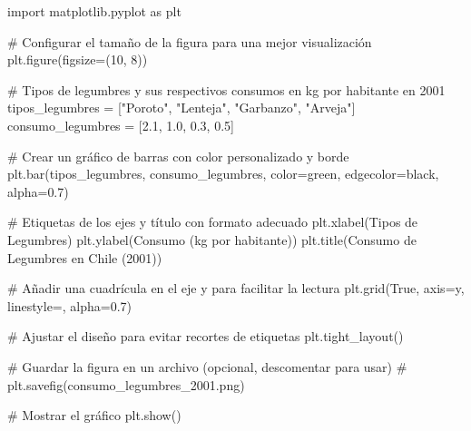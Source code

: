 \documentclass[
  jou,
  floatsintext,
  longtable,
  a4paper,
  nolmodern,
  notxfonts,
  notimes,
  colorlinks=true,linkcolor=blue,citecolor=blue,urlcolor=blue]{apa7}
\newenvironment{Shaded}{\begin{snugshade}}{\end{snugshade}}
\newcommand{\CommentTok}[1]{\textcolor[rgb]{0.37,0.37,0.37}{#1}}
\newcommand{\DecValTok}[1]{\textcolor[rgb]{0.68,0.00,0.00}{#1}}
\newcommand{\FloatTok}[1]{\textcolor[rgb]{0.68,0.00,0.00}{#1}}
\newcommand{\ImportTok}[1]{\textcolor[rgb]{0.00,0.46,0.62}{#1}}
\newcommand{\NormalTok}[1]{\textcolor[rgb]{0.00,0.23,0.31}{#1}}
\newcommand{\OperatorTok}[1]{\textcolor[rgb]{0.37,0.37,0.37}{#1}}
\newcommand{\StringTok}[1]{\textcolor[rgb]{0.13,0.47,0.30}{#1}}
\newcommand{\VariableTok}[1]{\textcolor[rgb]{0.07,0.07,0.07}{#1}}
\begin{document}
\begin{Shaded}
\begin{Highlighting}[]
\ImportTok{import}\NormalTok{ matplotlib.pyplot }\ImportTok{as}\NormalTok{ plt}

\CommentTok{\# Configurar el tamaño de la figura para una mejor visualización}
\NormalTok{plt.figure(figsize}\OperatorTok{=}\NormalTok{(}\DecValTok{10}\NormalTok{, }\DecValTok{8}\NormalTok{))}

\CommentTok{\# Tipos de legumbres y sus respectivos consumos en kg por habitante en 2001}
\NormalTok{tipos\_legumbres }\OperatorTok{=}\NormalTok{ [}\StringTok{"Poroto"}\NormalTok{, }\StringTok{"Lenteja"}\NormalTok{, }\StringTok{"Garbanzo"}\NormalTok{, }\StringTok{"Arveja"}\NormalTok{]}
\NormalTok{consumo\_legumbres }\OperatorTok{=}\NormalTok{ [}\FloatTok{2.1}\NormalTok{, }\FloatTok{1.0}\NormalTok{, }\FloatTok{0.3}\NormalTok{, }\FloatTok{0.5}\NormalTok{]}

\CommentTok{\# Crear un gráfico de barras con color personalizado y borde}
\NormalTok{plt.bar(tipos\_legumbres, consumo\_legumbres, color}\OperatorTok{=}\StringTok{\textquotesingle{}green\textquotesingle{}}\NormalTok{, edgecolor}\OperatorTok{=}\StringTok{\textquotesingle{}black\textquotesingle{}}\NormalTok{, alpha}\OperatorTok{=}\FloatTok{0.7}\NormalTok{)}

\CommentTok{\# Etiquetas de los ejes y título con formato adecuado}
\NormalTok{plt.xlabel(}\StringTok{\textquotesingle{}Tipos de Legumbres\textquotesingle{}}\NormalTok{)}
\NormalTok{plt.ylabel(}\StringTok{\textquotesingle{}Consumo (kg por habitante)\textquotesingle{}}\NormalTok{)}
\NormalTok{plt.title(}\StringTok{\textquotesingle{}Consumo de Legumbres en Chile (2001)\textquotesingle{}}\NormalTok{)}

\CommentTok{\# Añadir una cuadrícula en el eje y para facilitar la lectura}
\NormalTok{plt.grid(}\VariableTok{True}\NormalTok{, axis}\OperatorTok{=}\StringTok{\textquotesingle{}y\textquotesingle{}}\NormalTok{, linestyle}\OperatorTok{=}\StringTok{\textquotesingle{}{-}{-}\textquotesingle{}}\NormalTok{, alpha}\OperatorTok{=}\FloatTok{0.7}\NormalTok{)}

\CommentTok{\# Ajustar el diseño para evitar recortes de etiquetas}
\NormalTok{plt.tight\_layout()}

\CommentTok{\# Guardar la figura en un archivo (opcional, descomentar para usar)}
\CommentTok{\# plt.savefig(\textquotesingle{}consumo\_legumbres\_2001.png\textquotesingle{})}

\CommentTok{\# Mostrar el gráfico}
\NormalTok{plt.show()}
\end{Highlighting}
\end{Shaded}
\end{document}
